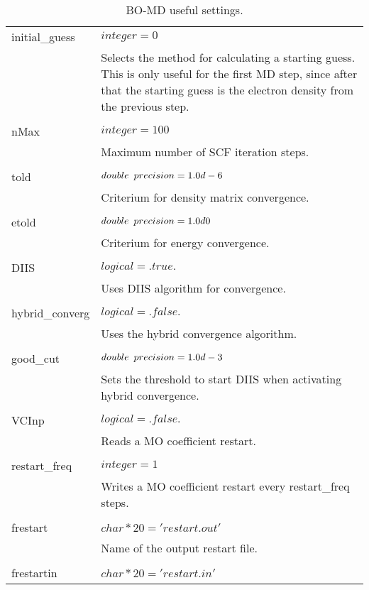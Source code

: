 \begin{Spacing}{1.0}
\begin{longtable}{ p{} p{} }
      \bottomrule
      \caption{BO-MD useful settings.}
      \endfoot
        initial\_guess & $ integer = 0 $ \\
        & Selects the method for calculating a starting guess. This is 
        only useful for the first MD step, since after that the starting
        guess is the electron density from the previous step.\\
        \\
        nMax & $ integer = 100 $ \\
        & Maximum number of SCF iteration steps.\\
        \\
        told  & $ double \hspace{0.5em} precision = 1.0d-6 $ \\
        & Criterium for density matrix convergence. \\
        \\
        etold & $ double \hspace{0.5em} precision = 1.0d0 $ \\
        & Criterium for energy convergence. \\
        \\
        DIIS  & $ logical = .true. $\\
        & Uses DIIS algorithm for convergence. \\
        \\
        hybrid\_converg & $ logical = .false. $\\
        & Uses the hybrid convergence algorithm. \\
        \\
        good\_cut & $ double \hspace{0.5em} precision = 1.0d-3 $\\
        & Sets the threshold to start DIIS when activating hybrid convergence. \\
        \\
        VCInp & $ logical = .false. $ \\
        & Reads a MO coefficient restart.\\
        \\
        restart\_freq & $ integer = 1 $ \\
        & Writes a MO coefficient restart every restart\_freq steps.\\
        \\
        frestart & $ char*20 = 'restart.out' $ \\
        & Name of the output restart file. \\
        \\
        frestartin & $ char*20 = 'restart.in' $ \\

\end{longtable}
\end{Spacing}
